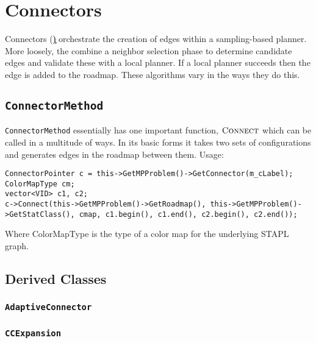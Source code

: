 \chapter{Connectors}

Connectors (\c) orchestrate the creation of edges within a sampling-based
planner. More loosely, the combine a neighbor selection phase to determine
candidate edges and validate these with a local planner. If a local planner
succeeds then the edge is added to the roadmap. These algorithms vary in the
ways they do this.

\section{\texttt{ConnectorMethod}}

\texttt{ConnectorMethod} essentially has one important function,
$\textsc{Connect}$ which can be called in a multitude of ways. In its basic forms
it takes two sets of configurations and generates edges in the roadmap between
them. Usage:
\begin{lstlisting}
ConnectorPointer c = this->GetMPProblem()->GetConnector(m_cLabel);
ColorMapType cm;
vector<VID> c1, c2;
c->Connect(this->GetMPProblem()->GetRoadmap(), this->GetMPProblem()->GetStatClass(), cmap, c1.begin(), c1.end(), c2.begin(), c2.end());
\end{lstlisting}
Where ColorMapType is the type of a color map for the underlying STAPL graph.

\section{Derived Classes}

\subsection{\texttt{AdaptiveConnector}}

\subsection{\texttt{CCExpansion}}


